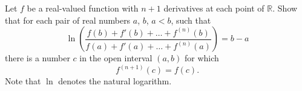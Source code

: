 \documentclass{article}
\begin{document}
	\setlength{\parindent}{0pt}
	Let $f$ be a real-valued function with $n + 1$ derivatives at each point of	$\mathbb{R}$. Show that for each pair of real numbers $a$, $b$, $a < b$, such that
	$$\ln\left(\frac{f(b) + f'(b) + \dots + f^(n)(b)}{f(a) + f'(a) +\dots + f^(n)(a)}\right)=b - a$$
	there is a number $c$ in the open interval $(a, b)$ for which	$$f^{(n+1)}(c) = f(c).$$
	Note that $\ln$ denotes the natural logarithm.
\end{document}
